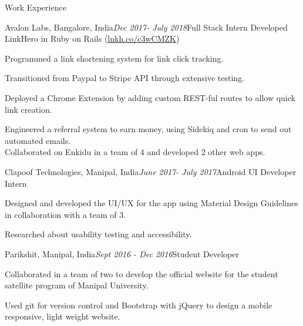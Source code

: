 \documentclass{resume} %
\begin{document}
\begin{rSection}{Work Experience}

    \begin{rSubsection}{Avalon Labs, Bangalore, India}{\em Dec 2017- July 2018}{Full Stack Intern}{}
    Developed LinkHero in Ruby on Rails (\href{http://lnkh.co/c3wCMZK}{lnkh.co/c3wCMZK})
    \item
    Programmed a link shortening system for link click tracking.
    \item 
    Transitioned from Paypal to Stripe API through extensive testing.
    \item
    Deployed a Chrome Extension by adding custom REST-ful routes to allow quick link creation.
    \item Engineered a referral system to earn money, using Sidekiq and cron to send out automated emails. \\
    Collaborated on Enkidu in a team of 4 and developed 2 other web apps.
    \end{rSubsection}
    
    \begin{rSubsection}{Clapoof Technologies, Manipal, India}{\em June 2017- July 2017}{Android UI Developer Intern}{}
    \item Designed and developed the UI/UX for the app using Material Design Guidelines in collaboration with a team of 3.
    \item Researched about usability testing and accessibility.
    \end{rSubsection}
    
    \begin{rSubsection}{Parikshit, Manipal, India}{\em Sept 2016 - Dec 2016}{Student Developer}{}
    \item Collaborated in a team of two to develop the official website for the student satellite program of Manipal University.
    \item Used git for version control and Bootstrap with jQuery to design a mobile responsive, light weight website. 
    \end{rSubsection}
\end{rSection}
\end{document}
